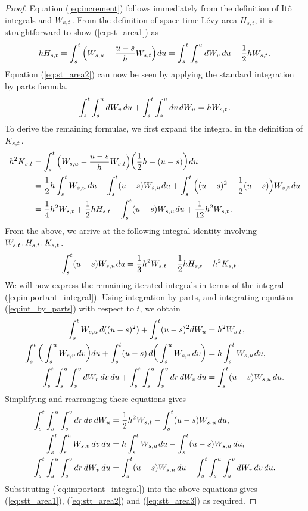 \documentclass[sn-mathphys-num]{sn-jnl}%
\newcommand{\m}{\hspace{0.25mm}}
\begin{document}
\begin{proof}
Equation (\ref{eq:increment}) follows immediately from the definition of It\^{o} integrals and $W_{s,t}\m$. From the definition of space-time L\'{e}vy area $H_{s,t}$, it is straightforward to show (\ref{eq:st_area1}) as
\begin{align*}
hH_{s,t} = \int_s^t \Big(W_{s,u} - \frac{u-s}{h}W_{s,t}\Big)\m du = \int_s^t\int_s^u dW_v\, du -  \frac{1}{2}h W_{s,t}\m.
\end{align*}
Equation (\ref{eq:st_area2}) can now be seen by applying the standard integration by parts formula,
\begin{align}\label{eq:int_by_parts}
\int_s^t\int_s^u dW_v\, du +  \int_s^t\int_s^u dv\, dW_u = hW_{s,t}\m.
\end{align}
To derive the remaining formulae, we first expand the integral in the definition of $K_{s,t}\m$.
\begin{align*}
h^2 K_{s,t} & =  \int_s^t \Big(W_{s,u} - \frac{u-s}{h}W_{s,t}\Big)\bigg(\frac{1}{2}h - (u-s)\bigg)\m du\\
& =  \frac{1}{2}h\int_s^t W_{s,u}\, du - \int_s^t (u-s)W_{s,u}\m du + \int_s^t \Big((u-s)^2 - \frac{1}{2}(u-s)\Big) W_{s,t}\, du\\
& = \frac{1}{4}h^2 W_{s,t} + \frac{1}{2}h H_{s,t} -  \int_s^t (u-s)W_{s,u}\m du + \frac{1}{12}h^2 W_{s,t}\m.
\end{align*}
From the above, we arrive at the following integral identity involving $W_{s,t}\m, H_{s,t}\m, K_{s,t}\m$.
\begin{align}\label{eq:important_integral}
\int_s^t (u-s)W_{s,u}\m du & = \frac{1}{3}h^2 W_{s,t} + \frac{1}{2}h H_{s,t} - h^2 K_{s,t}\m.
\end{align}
We will now express the remaining iterated integrals in terms of the integral (\ref{eq:important_integral}).
Using integration by parts, and integrating equation (\ref{eq:int_by_parts}) with respect to $t$, we obtain
\begin{align*}
\int_s^t W_{s,u}\, d((u-s)^2) + \int_s^t (u-s)^2 dW_u  & = h^2 W_{s,t}\m,\\
\int_s^t \bigg(\int_s^u W_{s,v}\, dv\bigg) du  + \int_s^t (u-s)\, d\bigg(\int_s^u W_{s,v}\, dv\bigg) & = h\int_s^t W_{s,u}\m du,\\
\int_s^t\int_s^u\int_s^v dW_r\, dv\, du + \int_s^t\int_s^u\int_s^v dr\, dW_v\, du  & =  \int_s^t (u-s)W_{s,u}\, du.
\end{align*}
Simplifying and rearranging these equations gives
\begin{align*}
\int_s^t\int_s^u\int_s^v dr\, dv\, dW_u  & = \frac{1}{2}h^2 W_{s,t} - \int_s^t (u-s)W_{s,u}\, du,\\
\int_s^t \int_s^u W_{s,v}\, dv\, du  & = h\int_s^t W_{s,u}\m du - \int_s^t (u-s)W_{s,u}\, du,\\
\int_s^t\int_s^u\int_s^v dr\, dW_v\, du  & =  \int_s^t (u-s)W_{s,u}\, du - \int_s^t\int_s^u\int_s^v dW_r\, dv\, du.
\end{align*}
Substituting (\ref{eq:important_integral}) into the above equations gives (\ref{eq:stt_area1}), (\ref{eq:stt_area2}) and (\ref{eq:stt_area3}) as required.
\end{proof}\medbreak
\end{document}
